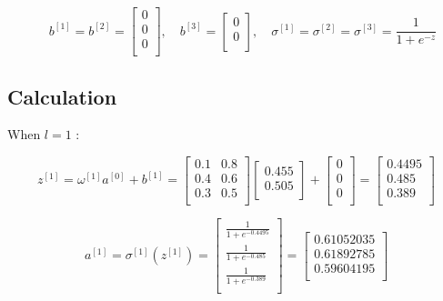 \documentclass{article}
\begin{document}
\[
    \quad
    b^{[1]} = b^{[2]} = \begin{bmatrix}
        0 \\
        0 \\
        0 \\
    \end{bmatrix},
    \quad
    b^{[3]} = \begin{bmatrix}
        0 \\
        0 \\
    \end{bmatrix},
    \quad
    \sigma^{[1]} = \sigma^{[2]} = \sigma^{[3]} = \frac{1}{1+e^{-z}}
\]

\subsection{Calculation}

When $l = 1$ :

\[
    z^{[1]} = \omega^{[1]} a^{[0]} + b^{[1]} = \begin{bmatrix}
        0.1 & 0.8 \\
        0.4 & 0.6 \\
        0.3 & 0.5 \\
    \end{bmatrix}
    \begin{bmatrix}
        0.455 \\
        0.505 \\
    \end{bmatrix}
    + \begin{bmatrix}
        0 \\
        0 \\
        0 \\
    \end{bmatrix}
    = \begin{bmatrix}
        0.4495 \\
        0.485  \\
        0.389  \\
    \end{bmatrix}
\]

\[
    a^{[1]} = \sigma^{[1]}(z^{[1]}) = \begin{bmatrix}
        \frac{1}{1+e^{-0.4495}} \\
        \frac{1}{1+e^{-0.485}}  \\
        \frac{1}{1+e^{-0.389}}  \\
    \end{bmatrix}
    = \begin{bmatrix}
        0.61052035 \\
        0.61892785 \\
        0.59604195 \\
    \end{bmatrix}
\]
\end{document}
